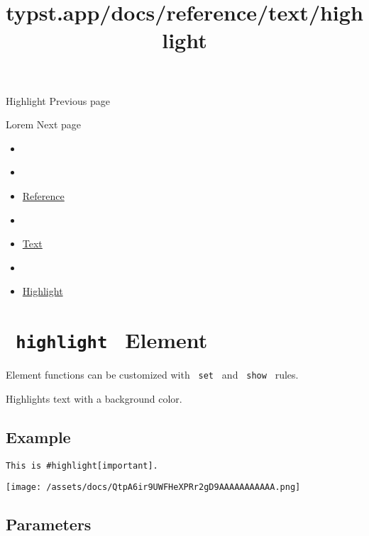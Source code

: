 { Highlight } { Previous page }

\href{/docs/reference/text/lorem/}{\pandocbounded{}}

{ Lorem } { Next page }


\title{typst.app/docs/reference/text/highlight}

\begin{itemize}
\tightlist
\item
  \href{/docs}{}
\item
  
\item
  \href{/docs/reference/}{Reference}
\item
  
\item
  \href{/docs/reference/text/}{Text}
\item
  
\item
  \href{/docs/reference/text/highlight/}{Highlight}
\end{itemize}

\section{\texorpdfstring{\texttt{\ highlight\ } {{ Element
}}}{ highlight   Element }}\label{summary}

\label{element-tooltip}
Element functions can be customized with \texttt{\ set\ } and
\texttt{\ show\ } rules.

Highlights text with a background color.

\subsection{Example}\label{example}

\begin{verbatim}
This is #highlight[important].
\end{verbatim}

\texttt{[image: /assets/docs/QtpA6ir9UWFHeXPRr2gD9AAAAAAAAAAA.png]}

\subsection{\texorpdfstring{{ Parameters
}}{ Parameters }}\label{parameters}

